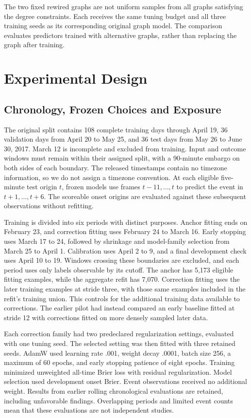 \documentclass{llncs}
\begin{document}
The two fixed rewired graphs are not uniform samples from all graphs satisfying the degree constraints. Each receives the same tuning budget and all three training seeds as its corresponding original graph model. The comparison evaluates predictors trained with alternative graphs, rather than replacing the graph after training.






\section{Experimental Design}
\subsection{Chronology, Frozen Choices and Exposure}
The original split contains 108 complete training days through April 19, 36 validation days from April 20 to May 25, and 36 test days from May 26 to June 30, 2017. March 12 is incomplete and excluded from training. Input and outcome windows must remain within their assigned split, with a 90-minute embargo on both sides of each boundary. The released timestamps contain no timezone information, so we do not assign a timezone convention. At each eligible five-minute test origin $t$, frozen models use frames $t-11,\ldots,t$ to predict the event in $t+1,\ldots,t+6$. The \TestOnsetN{} scoreable onset origins are evaluated against these subsequent observations without refitting.

Training is divided into six periods with distinct purposes. Anchor fitting ends on February 23, and correction fitting uses February 24 to March 16. Early stopping uses March 17 to 24, followed by shrinkage and model-family selection from March 25 to April 1. Calibration uses April 2 to 9, and a final development check uses April 10 to 19. Windows crossing these boundaries are excluded, and each period uses only labels observable by its cutoff. The anchor has 5,173 eligible fitting examples, while the aggregate refit has 7,070. Correction fitting uses the later training examples at stride three, with those same examples included in the refit's training union. This controls for the additional training data available to corrections. The earlier pilot had instead compared an early baseline fitted at stride 12 with corrections fitted on more densely sampled later data.

Each correction family had two predeclared regularization settings, evaluated with one tuning seed. The selected setting was then fitted with three retained seeds. AdamW used learning rate .001, weight decay .0001, batch size 256, a maximum of 60 epochs, and early stopping patience of eight epochs. Training minimized unweighted all-time Brier loss with residual regularization. Model selection used development onset Brier. Event observations received no additional weight. Results from earlier rolling chronological evaluations are retained, including unfavorable findings. Overlapping periods and limited event counts mean that these evaluations are not independent studies.
\end{document}
